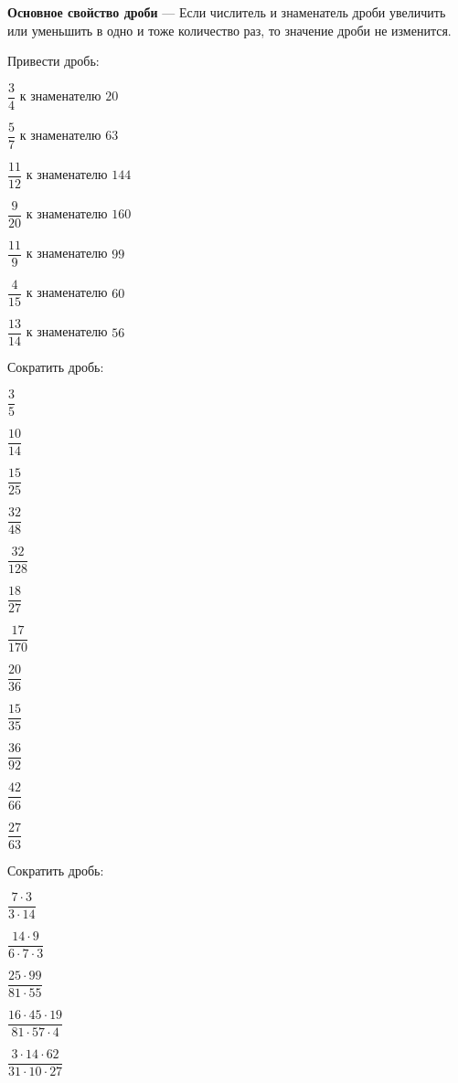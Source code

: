 \begin{definit}
	\textbf{Основное свойство дроби} --- Если числитель и знаменатель дроби увеличить или уменьшить в одно и тоже количество раз, то значение дроби не изменится.
\end{definit}
\begin{listofex}
	\item Привести дробь:
	\begin{enumcols}[itemcolumns=2]
		\item \( \dfrac{3}{4} \) к знаменателю \( 20 \)
		\item \( \dfrac{5}{7} \) к знаменателю \( 63 \)
		\item \( \dfrac{11}{12} \) к знаменателю \( 144 \)
		\item \( \dfrac{9}{20} \) к знаменателю \( 160 \)
		\item \( \dfrac{11}{9} \) к знаменателю \( 99 \)
		\item \( \dfrac{4}{15} \) к знаменателю \( 60 \)
		\item \( \dfrac{13}{14} \) к знаменателю \( 56 \)
	\end{enumcols}
	\item Сократить дробь:
	\begin{enumcols}[itemcolumns=6]
		\item \( \dfrac{3}{5} \)
		\item \( \dfrac{10}{14} \)
		\item \( \dfrac{15}{25} \)
		\item \( \dfrac{32}{48} \)
		\item \( \dfrac{32}{128} \)
		\item \( \dfrac{18}{27} \)
		\item \( \dfrac{17}{170} \)
		\item \( \dfrac{20}{36} \)
		\item \( \dfrac{15}{35} \)
		\item \( \dfrac{36}{92} \)
		\item \( \dfrac{42}{66} \)
		\item \( \dfrac{27}{63} \)
	\end{enumcols}
	\item Сократить дробь:
	\begin{enumcols}[itemcolumns=5]
		\item \( \dfrac{7\cdot3}{3\cdot14} \)
		\item \( \dfrac{14\cdot9}{6\cdot7\cdot3} \)
		\item \( \dfrac{25\cdot99}{81\cdot55} \)
		\item \( \dfrac{16\cdot45\cdot19}{81\cdot57\cdot4} \)
		\item \( \dfrac{3\cdot14\cdot62}{31\cdot10\cdot27} \)
	\end{enumcols}
\end{listofex}
